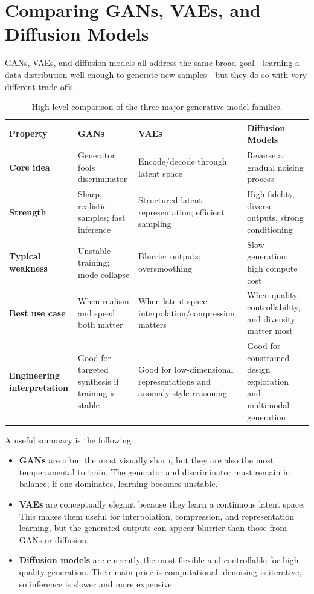 \documentclass[12pt]{article}
\begin{document}
\section{Comparing GANs, VAEs, and Diffusion Models}

GANs, VAEs, and diffusion models all address the same broad goal---learning a data distribution well enough to generate new samples---but they do so with very different trade-offs.

\begin{table}[ht]
    \centering
    \small
    \begin{tabulary}{\textwidth}{@{} L L L L @{}}
        \toprule
        \textbf{Property} & \textbf{GANs} & \textbf{VAEs} & \textbf{Diffusion Models} \\
        \midrule
        \textbf{Core idea} & Generator fools discriminator & Encode/decode through latent space & Reverse a gradual noising process \\
        \textbf{Strength} & Sharp, realistic samples; fast inference & Structured latent representation; efficient sampling & High fidelity, diverse outputs, strong conditioning \\
        \textbf{Typical weakness} & Unstable training; mode collapse & Blurrier outputs; oversmoothing & Slow generation; high compute cost \\
        \textbf{Best use case} & When realism and speed both matter & When latent-space interpolation/compression matters & When quality, controllability, and diversity matter most \\
        \textbf{Engineering interpretation} & Good for targeted synthesis if training is stable & Good for low-dimensional representations and anomaly-style reasoning & Good for constrained design exploration and multimodal generation \\
        \bottomrule
    \end{tabulary}
    \caption{High-level comparison of the three major generative model families.}
\end{table}

A useful summary is the following:
\begin{itemize}
    \item \textbf{GANs} are often the most visually sharp, but they are also the most temperamental to train. The generator and discriminator must remain in balance; if one dominates, learning becomes unstable.
    
    \item \textbf{VAEs} are conceptually elegant because they learn a continuous latent space. This makes them useful for interpolation, compression, and representation learning, but the generated outputs can appear blurrier than those from GANs or diffusion.
    
    \item \textbf{Diffusion models} are currently the most flexible and controllable for high-quality generation. Their main price is computational: denoising is iterative, so inference is slower and more expensive.
\end{itemize}
\end{document}
